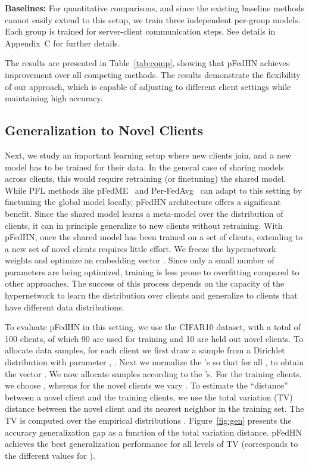 \documentclass{article}
\newcommand\ourmethod{pFedHN}
\begin{document}
\noindent\textbf{Baselines:} For quantitative comparisons, and since the existing baseline methods cannot easily extend to this setup, we train three independent per-group models. Each group is trained for  server-client communication steps. 
See details in Appendix~C for further details.

The results are presented in Table~\ref{tab:comp}, showing that \ourmethod{} achieves  improvement over all competing methods. The results demonstrate the flexibility of our approach, which is capable of adjusting to different client settings while maintaining high accuracy.


\subsection{Generalization to Novel Clients}



Next, we study an important learning setup where
new clients join, and a new model has to be trained for their data. In the general case of sharing models across clients, this would require retraining (or finetuning) the shared model. While PFL methods like pFedME~\cite{Dinh2020PersonalizedFL} and Per-FedAvg~\cite{Fallah2020PersonalizedFL} can adapt to this setting by finetuning the global model locally, \ourmethod{} architecture offers a significant benefit. Since the shared model learns a meta-model over the distribution of clients, it can in principle generalize to new clients without retraining. 
With \ourmethod{}, once the shared model  has been trained on a set of clients, extending to a new set of novel clients requires little effort. We freeze the hypernetwork weights  and optimize an embedding vector .
Since only a small number of parameters are being optimized, training is less prone to overfitting compared to other approaches. The success of this process depends on the capacity of the hypernetwork to learn the distribution over clients and generalize to clients that have different data distributions. 

To evaluate \ourmethod{} in this setting, we use the CIFAR10 dataset, with a total of 100 clients, of which 90 are used for training and 10 are held out novel clients. To allocate data samples, for each client  we first draw a sample from a Dirichlet distribution with parameter , . Next we normalize the 's so that  for all , to obtain the vector . We now allocate samples according to the 's. For the training clients, we choose , whereas for the novel clients we vary . To estimate the ``distance'' between a novel client and the training clients, we use the total variation (TV) distance between the novel client and its nearest neighbor in the training set. The TV is computed over the empirical distributions . Figure~\ref{fig:gen} presents the accuracy generalization gap as a function of the total variation distance. \ourmethod{} achieves the best generalization performance for all levels of TV (corresponds to the different values for ).
\end{document}
